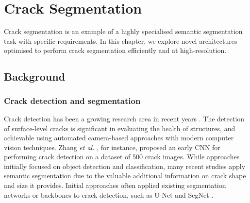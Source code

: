 \documentclass[a4paper,12pt]{report}
\begin{document}
\chapter{Crack Segmentation}
Crack segmentation is an example of a highly specialised semantic segmentation task with specific requirements. In this chapter, we explore novel architectures optimised to perform crack segmentation efficiently and at high-resolution.

\section{Background}
\subsection{Crack detection and segmentation}
Crack detection has been a growing research area in recent years \cite{hamishebahar_comprehensive_2022}. The detection of surface-level cracks is significant in evaluating the health of structures, and achievable using automated camera-based approaches with modern computer vision techniques. Zhang \textit{et al.} \cite{zhang_road_2016}, for instance, proposed an early CNN for performing crack detection on a dataset of 500 crack images. While approaches initially focused on object detection and classification, many recent studies apply semantic segmentation \cite{hamishebahar_comprehensive_2022} due to the valuable additional information on crack shape and size it provides. Initial approaches often applied existing segmentation networks or backbones to crack detection, such as U-Net \cite{david_jenkins_deep_2018} and SegNet \cite{chen_pavement_2020}.
\end{document}
